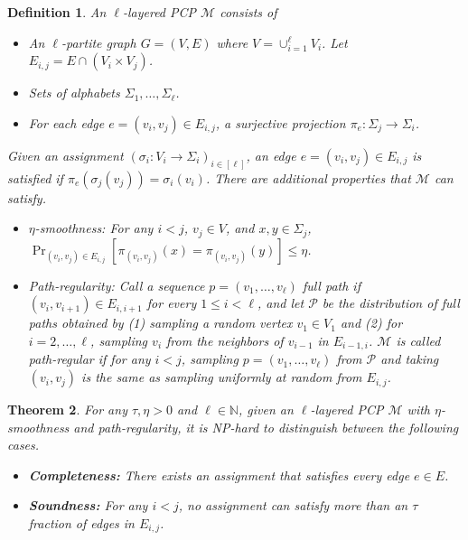 \documentclass[10pt,a4paper]{amsart}
\newtheorem{theorem}{Theorem}[section]
\newtheorem{definition}[theorem]{Definition}
\newcommand{\thmlab}[1]{\label{thm:#1}}
\newcommand{\calm}{\mathcal{M}}
\newcommand{\calp}{\mathcal{P}}
\newcommand{\NN}{\mathbb{N}}
\begin{document}
\begin{definition}
An $\ell$-layered PCP $\calm$ consists of
\begin{itemize}
\item An $\ell$-partite graph $G = (V, E)$ where $V = \cup_{i=1}^{\ell} V_i$. Let $E_{i,j} = E \cap (V_i \times V_j)$. 
\item Sets of alphabets $\Sigma_1, \dots, \Sigma_{\ell}$. 
\item For each edge $e = (v_i, v_j) \in E_{i,j}$, a surjective projection $\pi_e : \Sigma_j \to \Sigma_i$. 
\end{itemize}
Given an assignment $(\sigma_i : V_i \to \Sigma_i)_{i \in [\ell]}$, an edge $e = (v_i, v_j) \in E_{i,j}$ is {\em satisfied} if $\pi_e(\sigma_j(v_j)) = \sigma_i(v_i)$. 
There are additional properties that $\calm$ can satisfy.
\begin{itemize}
\item $\eta$-smoothness: For any $i < j$, $v_j \in V$, and $x, y \in \Sigma_j$, $\Pr_{(v_i, v_j) \in E_{i,j}} [\pi_{(v_i, v_j)}(x) = \pi_{(v_i, v_j)}(y)] \leq \eta$. 
\item Path-regularity: Call a sequence $p = (v_1, \dots, v_{\ell})$ {\em full path} if $(v_i, v_{i+1}) \in E_{i, i+1}$ for every $1 \leq i < \ell$,
and let $\calp$ be the distribution of full paths obtained by (1) sampling a random vertex $v_1 \in V_1$ and (2) for $i = 2, \dots, \ell$, sampling $v_i$ from the neighbors of $v_{i-1}$ in $E_{i-1, i}$. 
$\calm$ is called {\em path-regular} if for any $i < j$, sampling $p = (v_1, \dots, v_{\ell})$ from $\calp$ and taking $(v_i, v_j)$ is the same as sampling uniformly at random from $E_{i,j}$. 
\end{itemize}
\end{definition}


\begin{theorem}
\thmlab{thm:dgkr}
\cite{DGKR05, Khot02}
For any $\tau, \eta > 0$ and $\ell \in \NN$, given an $\ell$-layered PCP $\calm$ with $\eta$-smoothness and path-regularity, it is NP-hard to distinguish between the following cases.
\begin{itemize}
\item {\bf Completeness: } There exists an assignment that satisfies every edge $e \in E$.
\item {\bf Soundness: } For any $i < j$, no assignment can satisfy more than an $\tau$ fraction of edges in $E_{i,j}$. 
\end{itemize}
\end{theorem}
\end{document}
